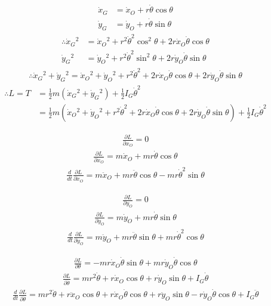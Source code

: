 \documentclass[a4paper,11pt]{jsarticle}
\begin{document}
\begin{align*}
  \dot{x}_G &= \dot{x}_O + r\dot{\theta}\cos\theta
  \\ \dot{y}_G &= \dot{y}_O + r\dot{\theta}\sin\theta
\end{align*}
\begin{align*}
  \therefore 
  \dot{x}_G{}^2 &= \dot{x}_O{}^2 + r^2\dot{\theta}^2\cos^2\theta + 2r\dot{x}_O\dot{\theta}\cos\theta
  \\ \dot{y}_G{}^2 &= \dot{y}_O{}^2 + r^2\dot{\theta}^2\sin^2\theta + 2r\dot{y}_O\dot{\theta}\sin\theta
\end{align*}
\begin{align*}
  \therefore \dot{x}_G{}^2 + \dot{y}_G{}^2 = \dot{x}_O{}^2 + \dot{y}_O{}^2 + r^2\dot{\theta}^2 + 2r\dot{x}_O\dot{\theta}\cos\theta + 2r\dot{y}_O\dot{\theta}\sin\theta
\end{align*}
\begin{align*}
  \therefore L = T &= \frac{1}{2}m(\dot{x}_G{}^2 + \dot{y}_G{}^2) + \frac{1}{2}I_G \dot{\theta}^2
  \\ & = \frac{1}{2}m\left(\dot{x}_O{}{}^2 + \dot{y}_O{}^2 + r^2\dot{\theta}^2 + 2r\dot{x}_O\dot{\theta}\cos\theta + 2r\dot{y}_O\dot{\theta}\sin\theta\right) + \frac{1}{2}I_G \dot{\theta}^2
\end{align*}

\begin{align*}
  \frac{\partial L}{\partial x_O} = 0
\end{align*}
\begin{align*}
  \frac{\partial L}{\partial \dot{x}_O} = m\dot{x}_O + mr\dot{\theta}\cos\theta
\end{align*}
\begin{align*}
  \frac{d}{dt}\frac{\partial L}{\partial \dot{x}_O} = m\ddot{x}_O + mr\ddot{\theta}\cos\theta - mr\dot{\theta}^2\sin\theta
\end{align*}

\begin{align*}
  \frac{\partial L}{\partial y_O} = 0
\end{align*}
\begin{align*}
  \frac{\partial L}{\partial \dot{y}_O} = m\dot{y}_O + mr\dot{\theta}\sin\theta
\end{align*}
\begin{align*}
  \frac{d}{dt}\frac{\partial L}{\partial \dot{y}_O} = m\ddot{y}_O + mr\ddot{\theta}\sin\theta + mr\dot{\theta}^2\cos\theta
\end{align*}

\begin{align*}
  \frac{\partial L}{\partial \theta} = -mr\dot{x}_O\dot{\theta}\sin\theta + mr\dot{y}_O\dot{\theta}\cos\theta
\end{align*}
\begin{align*}
  \frac{\partial L}{\partial \dot{\theta}} = mr^2\dot{\theta} + r\dot{x}_O\cos\theta + r\dot{y}_O\sin\theta + I_G\dot{\theta}
\end{align*}
\begin{align*}
  \frac{d}{dt}\frac{\partial L}{\partial \dot{\theta}} = mr^2\ddot{\theta} + r\ddot{x}_O\cos\theta 
  + r\dot{x}_O\dot{\theta}\cos\theta + r\ddot{y}_O\sin\theta - r\dot{y}_O\dot{\theta}\cos\theta + I_G\ddot{\theta}
\end{align*}
\end{document}

